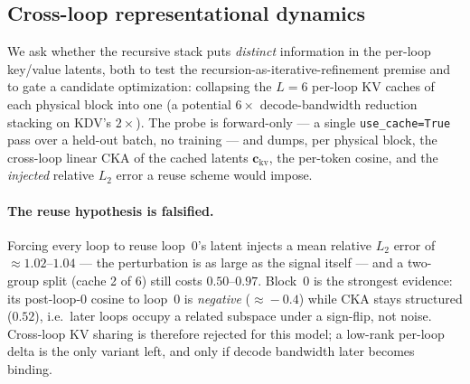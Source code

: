 
\subsection{Cross-loop representational dynamics}

We ask whether the recursive stack puts \emph{distinct} information in the
per-loop key/value latents, both to test the recursion-as-iterative-refinement
premise and to gate a candidate optimization: collapsing the $L{=}6$ per-loop KV
caches of each physical block into one (a potential $6\times$ decode-bandwidth
reduction stacking on KDV's $2\times$). The probe is forward-only --- a single
\texttt{use\_cache=True} pass over a held-out batch, no training --- and dumps,
per physical block, the cross-loop linear CKA of the cached latents
$\mathbf{c}_{\text{kv}}$, the per-token cosine, and the \emph{injected} relative
$L_2$ error a reuse scheme would impose.

\paragraph{The reuse hypothesis is falsified.} Forcing every loop to reuse
loop~0's latent injects a mean relative $L_2$ error of $\approx\!1.02\text{--}1.04$
--- the perturbation is as large as the signal itself --- and a two-group split
(cache 2 of 6) still costs $0.50\text{--}0.97$. Block~0 is the strongest evidence:
its post-loop-0 cosine to loop~0 is \emph{negative} ($\approx\!-0.4$) while CKA
stays structured ($0.52$), i.e.\ later loops occupy a related subspace under a
sign-flip, not noise. Cross-loop KV sharing is therefore rejected for this model;
a low-rank per-loop delta is the only variant left, and only if decode bandwidth
later becomes binding.

